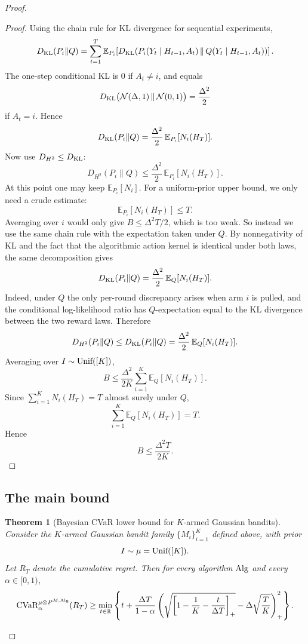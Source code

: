 \documentclass[conference]{IEEEtran}
\newtheorem{theorem}{Theorem}
\begin{document}
\begin{proof}[Proof]
\begin{proof}
Using the chain rule for KL divergence for sequential experiments,
\[
D_{\textup{KL}}(P_i\|Q)
=
\sum_{t=1}^T \mathbb{E}_{P_i}\!\left[
D_{\textup{KL}}\!\left(
P_i(Y_t\mid H_{t-1},A_t)\,\|\,Q(Y_t\mid H_{t-1},A_t)
\right)
\right].
\]
The one-step conditional KL is $0$ if $A_t\neq i$, and equals
\[
D_{\textup{KL}}\bigl(\mathcal N(\Delta,1)\,\|\,\mathcal N(0,1)\bigr)=\frac{\Delta^2}{2}
\]
if $A_t=i$.
Hence
\[
D_{\textup{KL}}(P_i\|Q)
=
\frac{\Delta^2}{2}\,\mathbb{E}_{P_i}[N_i(H_T)].
\]
Now use $D_{H^2}\le D_{\textup{KL}}$:
\[
D_{H^2}(P_i\|Q)\le \frac{\Delta^2}{2}\,\mathbb{E}_{P_i}[N_i(H_T)].
\]
At this point one may keep $\mathbb{E}_{P_i}[N_i]$.
For a uniform-prior upper bound, we only need a crude estimate:
\[
\mathbb{E}_{P_i}[N_i(H_T)]\le T.
\]
Averaging over $i$ would only give $B\le \Delta^2T/2$, which is too weak.
So instead we use the same chain rule with the expectation taken under $Q$.
By nonnegativity of KL and the fact that the algorithmic action kernel is identical under both laws,
the same decomposition gives
\[
D_{\textup{KL}}(P_i\|Q)
=
\frac{\Delta^2}{2}\,\mathbb{E}_Q[N_i(H_T)].
\]
Indeed, under $Q$ the only per-round discrepancy arises when arm $i$ is pulled, and the conditional log-likelihood ratio has $Q$-expectation equal to the KL divergence between the two reward laws.
Therefore
\[
D_{H^2}(P_i\|Q)\le D_{\textup{KL}}(P_i\|Q)=\frac{\Delta^2}{2}\,\mathbb{E}_Q[N_i(H_T)].
\]
Averaging over $I\sim\textup{Unif}([K])$,
\[
B
\le
\frac{\Delta^2}{2K}\sum_{i=1}^K \mathbb{E}_Q[N_i(H_T)].
\]
Since $\sum_{i=1}^K N_i(H_T)=T$ almost surely under $Q$,
\[
\sum_{i=1}^K \mathbb{E}_Q[N_i(H_T)] = T.
\]
Hence
\[
B\le \frac{\Delta^2T}{2K}.
\]
\end{proof}

\subsection{The main bound}

\begin{theorem}[Bayesian CVaR lower bound for $K$-armed Gaussian bandits]
\label{thm:k-armed-gaussian-cvar}
Consider the $K$-armed Gaussian bandit family $\{M_i\}_{i=1}^K$ defined above, with prior
\[
I\sim\mu=\textup{Unif}([K]).
\]
Let $R_T$ denote the cumulative regret.
Then for every algorithm $\textup{Alg}$ and every $\alpha\in[0,1)$,
\[
\textup{CVaR}_\alpha^{\mu\otimes P^{M,\textup{Alg}}}(R_T)
\ge
\min_{t\in\mathbb R}
\left\{
t+\frac{\Delta T}{1-\alpha}
\left(
\sqrt{\left[1-\frac1K-\frac{t}{\Delta T}\right]_+}
-
\Delta\sqrt{\frac{T}{K}}
\right)_+^2
\right\}.
\]
\end{theorem}


\end{proof}
\end{document}
